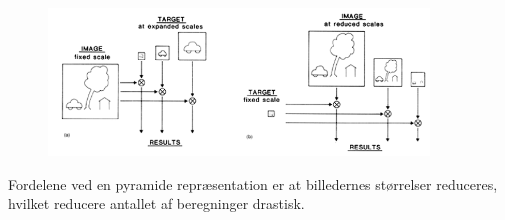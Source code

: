 \begin{figure}[H]
    \centering
    \includegraphics[width=0.90\textwidth]{fig/38.png}
     \vspace{-1em}
    \begin{center}    
       \caption{\textcolor{gray}{\footnotesize \textit{ }}}
    \label{fig:scalerepdiff}
     \end{center}
     \vspace{-2.5em}
  \end{figure} \noindent
Fordelene ved en pyramide repræsentation er at  billedernes størrelser reduceres, hvilket reducere antallet af beregninger drastisk.
